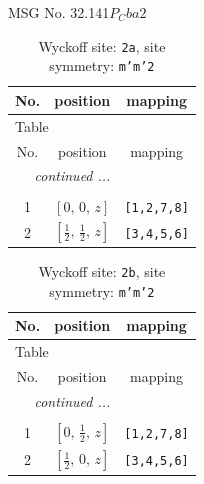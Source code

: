 \documentclass[fleqn,8pt]{jsarticle}
\begin{document}
\setcounter{MaxMatrixCols}{32}

\renewcommand{\tablename}{Table~}
\renewcommand{\figurename}{Figure~}
\begin{center}
\LARGE
MSG No. 32.141\quad$P_{C}ba2$
\end{center}
\renewcommand{\arraystretch}{1.2}
\begin{longtable}{ccc}
\caption{Wyckoff site: {\tt 2a}, site symmetry: {\tt m'm'2}}
 \\
 \hline \hline
No. & position & mapping \\ \hline \endfirsthead

\multicolumn{2}{l}{\tablename\ \thetable{}} \\
 \hline \hline
No. & position & mapping \\ \hline \endhead

 \hline \hline
\multicolumn{2}{r}{\footnotesize\it continued ...} \\ \endfoot

 \hline \hline
\multicolumn{2}{r}{} \\ \endlastfoot

1 & $\left[ 0,\, 0,\, z \right]$ & {\tt [1,2,7,8]} \\ \hline
2 & $\left[ \frac{1}{2},\, \frac{1}{2},\, z \right]$ & {\tt [3,4,5,6]} \\
\end{longtable}
\renewcommand{\arraystretch}{1.2}
\begin{longtable}{ccc}
\caption{Wyckoff site: {\tt 2b}, site symmetry: {\tt m'm'2}}
 \\
 \hline \hline
No. & position & mapping \\ \hline \endfirsthead

\multicolumn{2}{l}{\tablename\ \thetable{}} \\
 \hline \hline
No. & position & mapping \\ \hline \endhead

 \hline \hline
\multicolumn{2}{r}{\footnotesize\it continued ...} \\ \endfoot

 \hline \hline
\multicolumn{2}{r}{} \\ \endlastfoot

1 & $\left[ 0,\, \frac{1}{2},\, z \right]$ & {\tt [1,2,7,8]} \\ \hline
2 & $\left[ \frac{1}{2},\, 0,\, z \right]$ & {\tt [3,4,5,6]} \\
\end{longtable}
\renewcommand{\arraystretch}{1.2}
\end{document}
